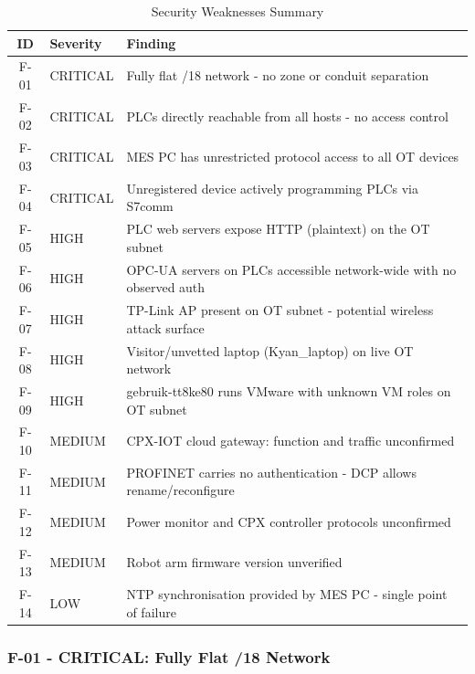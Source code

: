 \begin{table}[H]
\centering
\begin{tabular}{@{}cll@{}}
\toprule
\textbf{ID} & \textbf{Severity} & \textbf{Finding} \\
\midrule
F-01 & CRITICAL & Fully flat /18 network - no zone or conduit separation \\
F-02 & CRITICAL & PLCs directly reachable from all hosts - no access control \\
F-03 & CRITICAL & MES PC has unrestricted protocol access to all OT devices \\
F-04 & CRITICAL & Unregistered device actively programming PLCs via S7comm \\
F-05 & HIGH & PLC web servers expose HTTP (plaintext) on the OT subnet \\
F-06 & HIGH & OPC-UA servers on PLCs accessible network-wide with no observed auth \\
F-07 & HIGH & TP-Link AP present on OT subnet - potential wireless attack surface \\
F-08 & HIGH & Visitor/unvetted laptop (Kyan\_laptop) on live OT network \\
F-09 & HIGH & gebruik-tt8ke80 runs VMware with unknown VM roles on OT subnet \\
F-10 & MEDIUM & CPX-IOT cloud gateway: function and traffic unconfirmed \\
F-11 & MEDIUM & PROFINET carries no authentication - DCP allows rename/reconfigure \\
F-12 & MEDIUM & Power monitor and CPX controller protocols unconfirmed \\
F-13 & MEDIUM & Robot arm firmware version unverified \\
F-14 & LOW & NTP synchronisation provided by MES PC - single point of failure \\
\bottomrule
\end{tabular}
\caption{Security Weaknesses Summary}
\end{table}

\subsubsection{F-01 - CRITICAL: Fully Flat /18 Network}

